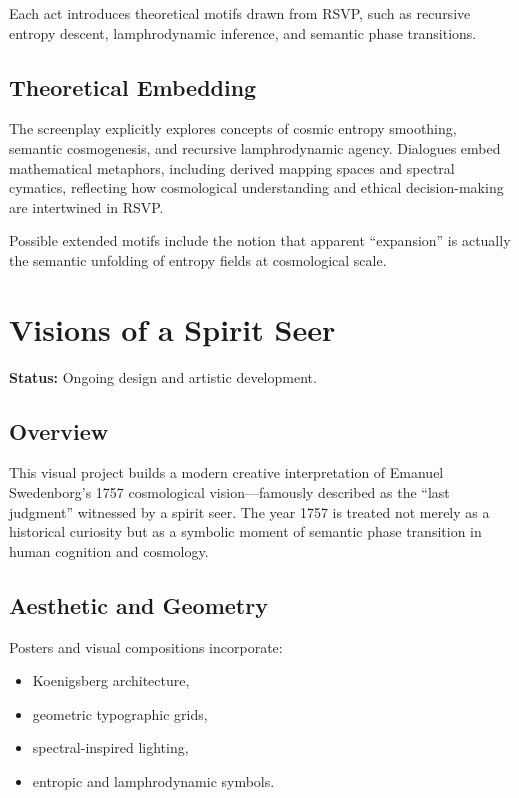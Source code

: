 \documentclass[12pt]{article}
\theoremstyle{plain}
\theoremstyle{definition}
\theoremstyle{remark}
\begin{document}
Each act introduces theoretical motifs drawn from RSVP, such as recursive
entropy descent, lamphrodynamic inference, and semantic phase transitions.


\subsection{Theoretical Embedding}

The screenplay explicitly explores concepts of cosmic entropy smoothing,
semantic cosmogenesis, and recursive lamphrodynamic agency. Dialogues embed
mathematical metaphors, including derived mapping spaces and spectral
cymatics, reflecting how cosmological understanding and ethical decision-making
are intertwined in RSVP.

Possible extended motifs include the notion that apparent ``expansion'' is
actually the semantic unfolding of entropy fields at cosmological scale.


\newpage


\section{Visions of a Spirit Seer}

\textbf{Status:} Ongoing design and artistic development.

\subsection{Overview}

This visual project builds a modern creative interpretation of Emanuel
Swedenborg's 1757 cosmological vision---famously described as the ``last
judgment'' witnessed by a spirit seer. The year 1757 is treated not merely as
a historical curiosity but as a symbolic moment of semantic phase transition in
human cognition and cosmology.


\subsection{Aesthetic and Geometry}

Posters and visual compositions incorporate:
\begin{itemize}
    \item Koenigsberg architecture,
    \item geometric typographic grids,
    \item spectral-inspired lighting,
    \item entropic and lamphrodynamic symbols.
\end{itemize}
\end{document}
